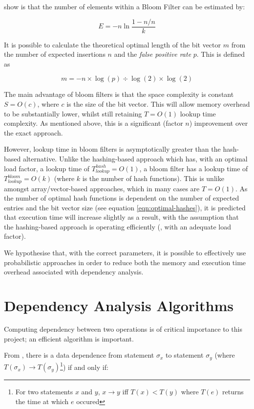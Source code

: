 		\citet{Swamidass2007} show is that the number of elements within a Bloom Filter can be estimated by:
		
		\[
		E = -n \ln \frac{1-n/n}{k}
		\]
		
		
		It is possible to calculate the theoretical optimal length of the bit vector $m$ from the number of expected insertions $n$ and the \textit{false positive rate} $p$. This is defined as

		\[
			m = -n \times \log(p) \div \log(2) \times \log(2)
		\]
		
		The main advantage of bloom filters is that the space complexity is constant $S=O(c)$, where $c$ is the size of the bit vector. This will allow memory overhead to be substantially lower, whilst still retaining $T=O(1)$ lookup time complexity. As mentioned above, this is a significant (factor $n$) improvement over the exact approach.

		However, lookup time in bloom filters is asymptotically greater than the hash-based alternative. Unlike the hashing-based approach which has, with an optimal load factor, a lookup time of $T_{lookup}^{hash}=O(1)$, a bloom filter has a lookup time of $T_{lookup}^{bloom}=O(k)$ (where $k$ is the number of hash functions). This is unlike amongst array/vector-based approaches, which in many cases are $T=O(1)$. As the number of optimal hash functions is dependent on the number of expected entries and the bit vector size (see equation \ref{eqn:optimal-hashes}), it is predicted that execution time will increase slightly as a result, with the assumption that the hashing-based approach is operating efficiently (\ie, with an adequate load factor).
		
		We hypothesise that, with the correct parameters, it is possible to effectively use probabilistic approaches in order to reduce both the memory and execution time overhead associated with dependency analysis.

\section{Dependency Analysis Algorithms} \label{sec:runtime/analysis}
	Computing dependency between two operations is of critical importance to this project; an efficient algorithm is important.
	
	From \citet[p.~37]{Allen2000}, there is a data dependence from statement $\sigma_x$ to statement $\sigma_y$ (where $T(\sigma_x) \rightarrow T(\sigma_y)$\footnote{For two statements $x$ and $y$, $x \rightarrow y$ iff $T(x) < T(y)$ where $T(e)$ returns the time at which $e$ occured}) if and only if:
	
